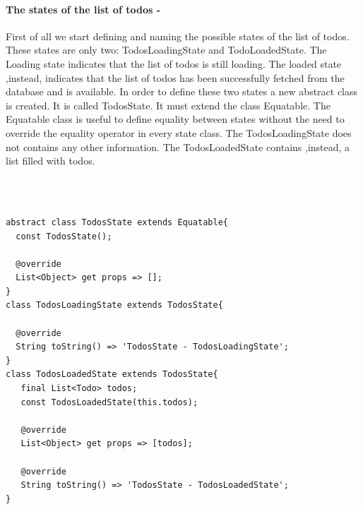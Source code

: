 \paragraph{The states of the list of todos - }
\label{subpar:todo_app_bloc_core_state}
First of all we start defining and naming the possible states of the list of todos. These states are only two: TodosLoadingState and TodoLoadedState. The Loading state indicates that the list of todos is still loading. The loaded state ,instead, indicates that the list of todos has been successfully fetched from the database and is available. In order to define these two states a new abstract class is created. It is called TodosState. It must extend the class Equatable. The  Equatable class is useful to define equality between states without the need to override the equality operator in every state class. The TodosLoadingState does not contains any other information. The TodosLoadedState contains ,instead, a list filled with todos.
\begin{code}
\mbox{}\\
 \mbox{}
\label{code:2.14}
\begin{verbatim}

abstract class TodosState extends Equatable{
  const TodosState();
  
  @override
  List<Object> get props => [];
}
class TodosLoadingState extends TodosState{

  @override
  String toString() => 'TodosState - TodosLoadingState';
}
class TodosLoadedState extends TodosState{
   final List<Todo> todos;
   const TodosLoadedState(this.todos);
   
   @override
   List<Object> get props => [todos];
   
   @override
   String toString() => 'TodosState - TodosLoadedState';
} 
\end{verbatim}
\mbox{}
\end{code}



